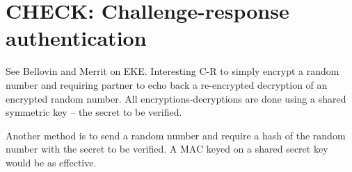 \section{CHECK: Challenge-response authentication}

See Bellovin and Merrit on EKE. Interesting C-R to simply encrypt a random number and requiring partner to echo back a re-encrypted decryption of an encrypted random number. All encryptions-decryptions are done using a shared symmetric key -- the secret to be verified.

Another method is to send a random number and require a hash of the random number with the secret to be verified. A MAC keyed on a shared secret key would be as effective.